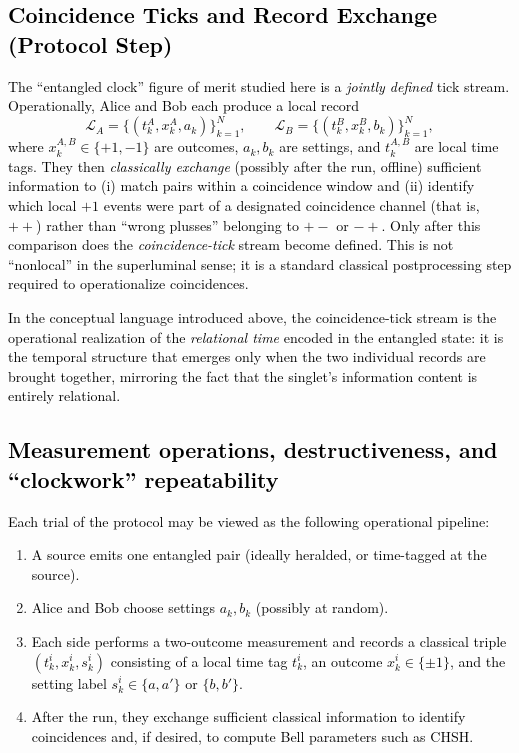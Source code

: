 \documentclass[reprint,aps,pra,longbibliography]{revtex4-2}
\newcommand{\rev}[1]{\textcolor{black}{#1}} %
\newcommand{\revG}[1]{\textcolor{black}{#1}} %
\newcommand{\revA}[1]{\textcolor{black}{#1}} %
\begin{document}
\subsection{\rev{Coincidence Ticks and Record Exchange (Protocol Step)}}
\label{sec:coincidence-ticks}
\rev{The ``entangled clock'' figure of merit studied here is a \emph{jointly defined} tick stream. Operationally, Alice and Bob each produce a local record
\[
\mathcal{L}_A=\{(t_k^A, x_k^A, a_k)\}_{k=1}^N,\qquad \mathcal{L}_B=\{(t_k^B, x_k^B, b_k)\}_{k=1}^N,
\]
where $x_k^{A,B}\in\{+1,-1\}$ are outcomes, $a_k,b_k$ are settings, and $t_k^{A,B}$ are local time tags. They then \emph{classically exchange} (possibly after the run, offline) sufficient information to (i) match pairs within a coincidence window and (ii) identify which local $+1$ events were part of a designated coincidence channel (that is, $++$) rather than ``wrong plusses'' belonging to $+-$ or $-+$. Only after this comparison does the \emph{coincidence-tick} stream become defined. This is not ``nonlocal'' in the superluminal sense; it is a standard classical postprocessing step required to operationalize coincidences.}

\revA{In the conceptual language introduced above, the coincidence-tick stream is the operational realization of the \emph{relational time} encoded in the entangled state: it is the temporal structure that emerges only when the two individual records are brought together, mirroring the fact that the singlet's information content is entirely relational.}

\subsection{\revG{Measurement operations, destructiveness, and ``clockwork'' repeatability}}

\revG{Each trial of the protocol may be viewed as the following operational pipeline:}
\begin{enumerate}
\item \revG{A source emits one entangled pair (ideally heralded, or time-tagged at the source).}
\item \revG{Alice and Bob choose settings $a_k,b_k$ (possibly at random).}
\item \revG{Each side performs a two-outcome measurement and records a classical triple $(t_k^i,x_k^i,s_k^i)$ consisting of a local time tag $t_k^i$, an outcome $x_k^i\in\{\pm1\}$, and the setting label $s_k^i\in\{a,a'\}$ or $\{b,b'\}$.}
\item \revG{After the run, they exchange sufficient classical information to identify coincidences and, if desired, to compute Bell parameters such as CHSH.}
\end{enumerate}
\end{document}
